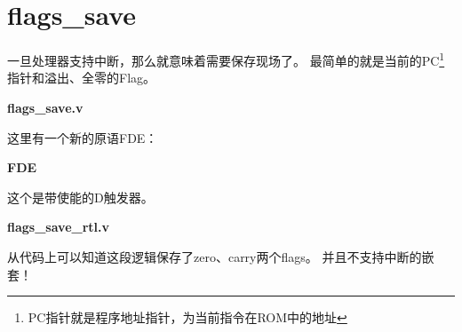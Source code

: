 \section{flags\_save}

一旦处理器支持中断，那么就意味着需要保存现场了。
最简单的就是当前的PC\footnote{PC指针就是程序地址指针，为当前指令在ROM中的地址}
指针和溢出、全零的Flag。

\textbf{flags\_save.v}


这里有一个新的原语FDE：

\textbf{FDE}


这个是带使能的D触发器。

\textbf{flags\_save\_rtl.v}


从代码上可以知道这段逻辑保存了zero、carry两个flags。
并且不支持中断的嵌套！


